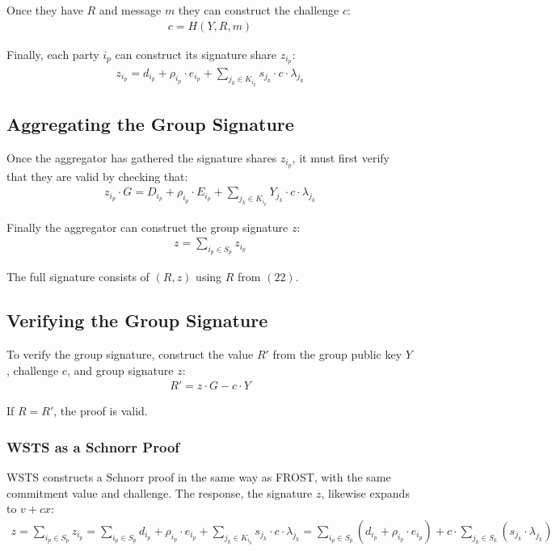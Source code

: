 \documentclass{article}
\theoremstyle{definition}
\theoremstyle{remark}
\begin{document}
Once they have $R$ and message $m$ they can construct the challenge $c$:
\begin{align}
  c = H(Y, R, m)
\end{align}

Finally, each party $i_p$ can construct its signature share $z_{i_p}$:
\begin{align}
  z_{i_p} = d_{i_p} + \rho_{i_p} \cdot e_{i_p} + \sum_{j_k \in K_{i_p}}^{} s_{j_k} \cdot c \cdot \lambda_{j_k}
\end{align}


\subsection{
  Aggregating the Group Signature
}

Once the aggregator has gathered the signature shares $z_{i_p}$, it must first verify that they are valid by checking that:
\begin{align}
  z_{i_p} \cdot G = D_{i_p} + \rho_{i_p} \cdot E_{i_p} + \sum_{j_k \in K_{i_p}}^{} Y_{j_k} \cdot c \cdot \lambda_{j_k}
\end{align}

Finally the aggregator can construct the group signature $z$:
\begin{align}
  z = \sum_{i_p \in S_p}^{} z_{i_p}
\end{align}

The full signature consists of $(R, z)$ using $R$ from $(22)$.

\subsection{
  Verifying the Group Signature
}

To verify the group signature, construct the value $R'$ from the group public key $Y$, challenge $c$, and group signature $z$:
\begin{align}
  R' = z \cdot G - c \cdot Y
\end{align}

If $R = R'$, the proof is valid.

\subsubsection{
  WSTS as a Schnorr Proof
}

WSTS constructs a Schnorr proof in the same way as FROST, with the same commitment value and challenge.  The response, the signature $z$, likewise expands to $v + cx$:
\begin{align}
  z = \sum_{i_p \in S_p}^{} z_{i_p} = \sum_{i_p \in S_p}^{} d_{i_p} + \rho_{i_p} \cdot e_{i_p} + \sum_{j_k \in K_{i_p}}^{} s_{j_k} \cdot c \cdot \lambda_{j_k} = \sum_{i_p \in S_p}^{} (d_{i_p} + \rho_{i_p} \cdot e_{i_p}) + c \cdot \sum_{j_k \in S_k}^{} (s_{j_k} \cdot \lambda_{j_k})\nonumber
\end{align}
\end{document}
